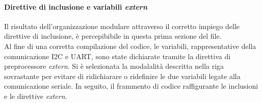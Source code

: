 \documentclass[11pt]{report}
\begin{document}
\paragraph{Direttive di inclusione e variabili \textit{extern}}
Il risultato dell'organizzazione modulare attraverso il corretto impiego delle direttive di inclusione, è percepibibile in questa prima sezione del file.\\
Al fine di una corretta compilazione del codice, le variabili, rappresentative della comunicazione I2C e UART, sono state dichiarate tramite la direttiva di preprocessore \textit{extern}.
Si è selezionata la modalalità descritta nella riga sovrastante per evitare di ridichiarare o ridefinire le due variabili legate alla comunicazione seriale.
In seguito, il frammento di codice raffigurante le inclusioni e le direttive \textit{extern}.

\end{document}

